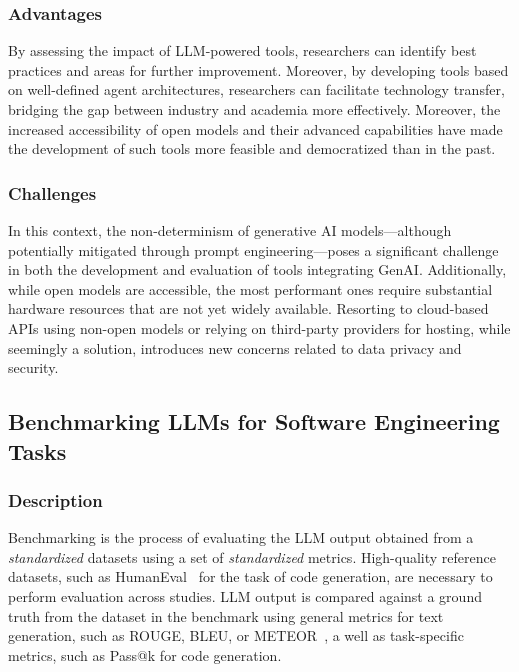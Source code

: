 \subsubsection{Advantages}

By assessing the impact of LLM-powered tools, researchers can identify best practices and areas for further improvement.
Moreover, by developing tools based on well-defined agent architectures, researchers can facilitate technology transfer, bridging the gap between industry and academia more effectively. 
Moreover, the increased accessibility of open models and their advanced capabilities have made the development of such tools more feasible and democratized than in the past.

\subsubsection{Challenges}


In this context, the non-determinism of generative AI models—although potentially mitigated through prompt engineering—poses a significant challenge in both the development and evaluation of tools integrating GenAI. 
Additionally, while open models are accessible, the most performant ones require substantial hardware resources that are not yet widely available. Resorting to cloud-based APIs using non-open models or relying on third-party providers for hosting, while seemingly a solution, introduces new concerns related to data privacy and security.


\subsection{Benchmarking LLMs for Software Engineering Tasks}

\subsubsection{Description}

Benchmarking is the process of evaluating the LLM output obtained from a \emph{standardized} datasets using a set of \emph{standardized} metrics.
High-quality reference datasets, such as HumanEval~\cite{DBLP:journals/corr/abs-2107-03374} for the task of code generation, are necessary to perform evaluation across studies.
LLM output is compared against a ground truth from the dataset in the benchmark using general metrics for text generation, such as ROUGE, BLEU, or METEOR~\cite{10.1145/3695988}, a well as task-specific metrics, such as Pass@k for code generation.

